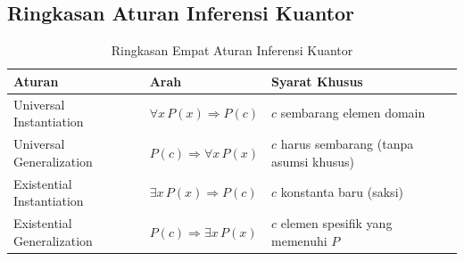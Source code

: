 \subsection{Ringkasan Aturan Inferensi Kuantor}

\begin{table}[H]
\centering
\renewcommand{\arraystretch}{1.3}
\begin{tabular}{|p{4cm}|p{3.5cm}|p{4.5cm}|}
\hline
\textbf{Aturan} & \textbf{Arah} & \textbf{Syarat Khusus} \\ \hline
Universal Instantiation & $\forall x\, P(x) \Rightarrow P(c)$ & $c$ sembarang elemen domain \\ \hline
Universal Generalization & $P(c) \Rightarrow \forall x\, P(x)$ & $c$ harus sembarang (tanpa asumsi khusus) \\ \hline
Existential Instantiation & $\exists x\, P(x) \Rightarrow P(c)$ & $c$ konstanta baru (saksi) \\ \hline
Existential Generalization & $P(c) \Rightarrow \exists x\, P(x)$ & $c$ elemen spesifik yang memenuhi $P$ \\ \hline
\end{tabular}
\caption{Ringkasan Empat Aturan Inferensi Kuantor}
\end{table}
